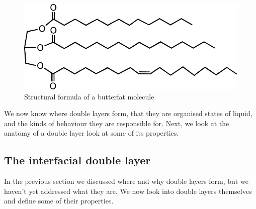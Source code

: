     \begin{figure}
        \begin{center}
            \includegraphics[scale=0.8]{content/introduction/graphics/butterfat}
        \end{center}
        \caption{Structural formula of a butterfat molecule}
        \label{fig:butterfat}
    \end{figure}

    We now know where double layers form, that they are organised states of liquid, and the kinds of behaviour they are responsible for.
    Next, we look at the anatomy of a double layer look at some of its properties.

  \subsection{The interfacial double layer}

    In the previous section we discussed where and why double layers form, but we haven't yet addressed what they are.
    We now look into double layers themselves and define some of their properties.

